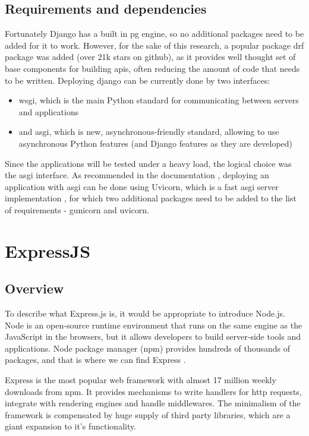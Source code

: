\subsection{Requirements and dependencies}
Fortunately Django has a built in \acrlong{pg} engine, so no additional packages need to be added for it to work. However, for the sake of this research, a popular package \acrlong{drf} package was added (over 21k stars on github), as it provides well thought set of base components for building \acrshort{api}s, often reducing the amount of code that needs to be written.
Deploying django can be currently done by two interfaces:
\begin{itemize}
  \item \acrshort{wsgi}, which is the main Python standard for communicating between servers and applications
  \item and \acrshort{asgi}, which is new, asynchronous-friendly standard, allowing to use asynchronous Python features (and Django features as they are developed) \cite{deployingDjango}
\end{itemize}

Since the applications will be tested under a heavy load, the logical choice was the \acrshort{asgi} interface. As recommended in the documentation \cite{deployingDjango}, deploying an application with \acrshort{asgi} can be done using Uvicorn, which is a fast \acrshort{asgi} server implementation \cite{uvicorn}, for which two additional packages need to be added to the list of requirements - gunicorn and uvicorn.

\section{ExpressJS}

\subsection{Overview}

To describe what Express.js is, it would be appropriate to introduce Node.js. Node is an open-source runtime environment that runs on the same engine as the JavaScript in the browsers, but it allows developers to build server-side tools and applications. Node package manager (\acrshort{npm}) provides hundreds of thousands of packages, and that is where we can find Express \cite{expressIntroduction}.

Express is the most popular web framework with almost 17 million weekly downloads from \acrshort{npm}. It provides mechanisms to write handlers for \acrshort{http} requests, integrate with rendering engines and handle middlewares. The minimalism of the framework is compensated by huge supply of third party libraries, which are a giant expansion to it's functionality.


